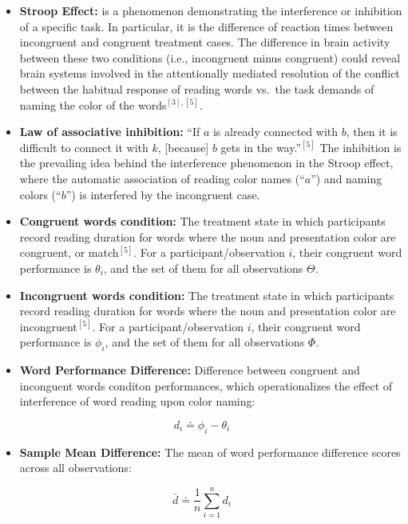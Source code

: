 \documentclass[11pt]{article}
\providecommand{\tightlist}{%
      \setlength{\itemsep}{0pt}\setlength{\parskip}{0pt}}
\begin{document}
\begin{itemize}
\item
  \textbf{Stroop Effect:} is a phenomenon demonstrating the interference
  or inhibition of a specific task. In particular, it is the difference
  of reaction times between incongruent and congruent treatment cases.
  The difference in brain activity between these two conditions (i.e.,
  incongruent minus congruent) could reveal brain systems involved in
  the attentionally mediated resolution of the conflict between the
  habitual response of reading words vs.~the task demands of naming the
  color of the words\(^{[3],[5]}\).
\item
  \textbf{Law of associative inhibition:} ``If \(a\) is already
  connected with \(b\), then it is difficult to connect it with \(k\),
  {[}because{]} \(b\) gets in the way.''\(^{[5]}\) The inhibition is the
  prevailing idea behind the interference phenomenon in the Stroop
  effect, where the automatic association of reading color names
  (``\(a\)'') and naming colors (``\(b\)'') is interfered by the
  incongruent case.
\item
  \textbf{Congruent words condition:} The treatment state in which
  participants record reading duration for words where the noun and
  presentation color are congruent, or match\(^{[5]}\). For a
  participant/observation \(i\), their congruent word performance is
  \(\theta_{i}\), and the set of them for all observations \(\Theta\).
\item
  \textbf{Incongruent words condition:} The treatment state in which
  participants record reading duration for words where the noun and
  presentation color are incongruent\(^{[5]}\). For a
  participant/observation \(i\), their congruent word performance is
  \(\phi_{i}\), and the set of them for all observations \(\Phi\).
\item
  \textbf{Word Performance Difference:} Difference between congruent and
  inconguent words conditon performances, which operationalizes the
  effect of interference of word reading upon color naming:
\end{itemize}

\[d_{i} \doteq \phi_i - \theta_i\]

\begin{itemize}
\tightlist
\item
  \textbf{Sample Mean Difference:} The mean of word performance
  difference scores across all observations:
\end{itemize}

\[\bar{d} \doteq \frac{1}{n}\sum_{i = 1}^{n} d_{i}\]
\end{document}
